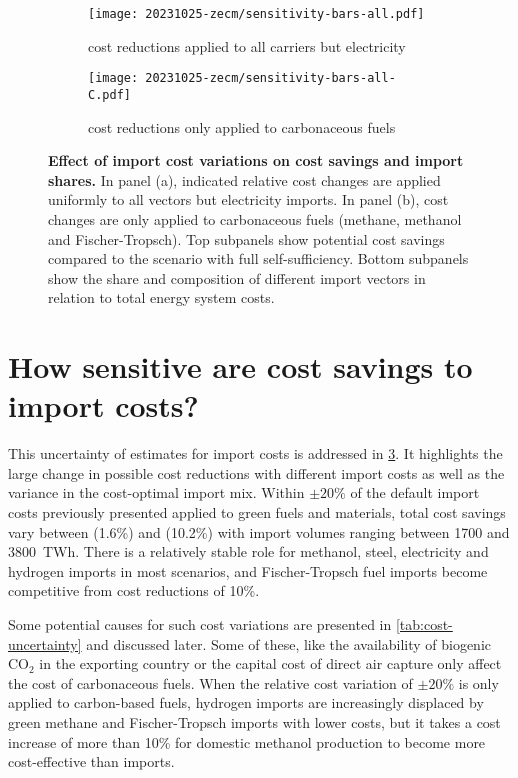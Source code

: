 \begin{figure}
    \begin{subfigure}[t]{\columnwidth}
        \caption{cost reductions applied to all carriers but electricity}
        \label{fig:sensitivity-costs:A}
        \texttt{[image: 20231025-zecm/sensitivity-bars-all.pdf]}
    \end{subfigure}
    \begin{subfigure}[t]{\columnwidth}
        \caption{cost reductions only applied to carbonaceous fuels}
        \label{fig:sensitivity-costs:B}
        \texttt{[image: 20231025-zecm/sensitivity-bars-all-C.pdf]}
    \end{subfigure}
    \caption{\textbf{Effect of import cost variations on cost savings and import shares.}
    In panel (a), indicated relative cost changes are applied uniformly to all vectors but electricity imports.
    In panel (b), cost changes are only applied to carbonaceous fuels (methane, methanol and Fischer-Tropsch).
    Top subpanels show potential cost savings compared to the scenario with full self-sufficiency.
    Bottom subpanels show the share and composition of different import vectors in relation to total energy system costs.
    }
    \label{fig:sensitivity-costs}
\end{figure}

\section*{How sensitive are cost savings to import costs?}

This uncertainty of estimates for import costs is addressed in
\cref{fig:sensitivity-costs}. It highlights the large change in possible cost
reductions with different import costs as well as the variance in the
cost-optimal import mix. Within $\pm 20\%$ of the default import costs
previously presented applied to green fuels and materials, total cost savings
vary between  (1.6\%) and  (10.2\%) with import volumes
ranging between 1700 and 3800~TWh. There is a relatively stable role for
methanol, steel, electricity and hydrogen imports in most scenarios, and
Fischer-Tropsch fuel imports become competitive from cost reductions of 10\%.

Some potential causes for such cost variations are presented in
\cref{tab:cost-uncertainty} and discussed later. Some of these, like the
availability of biogenic CO$_2$ in the exporting country or the capital cost of
direct air capture only affect the cost of carbonaceous fuels. When the relative
cost variation of $\pm 20\%$ is only applied to carbon-based fuels, hydrogen
imports are increasingly displaced by green methane and Fischer-Tropsch imports
with lower costs, but it takes a cost increase of more than 10\% for domestic
methanol production to become more cost-effective than imports. 

